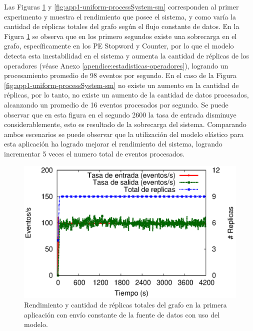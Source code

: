 
Las Figuras \ref{fig:app1-uniform-processSystem-cm} y \ref{fig:app1-uniform-processSystem-sm} \normalsize{corresponden al primer experimento y muestra el rendimiento que posee el sistema, y como var\'ia la cantidad de r\'eplicas totales del grafo seg\'un el flujo constante de datos.} En la Figura \ref{fig:app1-uniform-processSystem-cm} \normalsize{se observa que en los primero segundos existe una sobrecarga en el grafo, espec\'ificamente en los PE Stopword y Counter, por lo que el modelo detecta esta inestabilidad en el sistema y aumenta la cantidad de r\'eplicas de los operadores} (v\'ease Anexo \ref{apendice:estadisticas-operadores}), \normalsize{logrando un procesamiento promedio de  98 eventos por segundo.} En el caso de la Figura \ref{fig:app1-uniform-processSystem-sm} \normalsize{no existe un aumento en la cantidad de r\'eplicas, por lo tanto, no existe un aumento de la cantidad de datos procesados, alcanzando un promedio de 16 eventos procesados por segundo. Se puede observar que en esta figura en el segundo 2600 la tasa de entrada disminuye considerablemente, esto es resultado de la sobrecarga del sistema. Comparando ambos escenarios se puede observar que la utilizaci\'on del modelo el\'astico para esta aplicaci\'on ha logrado mejorar el rendimiento del sistema, logrando incrementar 5 veces el numero total de eventos procesados.}

\begin{figure}[!ht]
	\centering
	\includegraphics[scale=0.65]{images/exp/app1/uniform/cm/processSystem.eps}
    \caption{Rendimiento y cantidad de r\'eplicas totales del grafo en la primera aplicaci\'on con env\'io constante de la fuente de datos con uso del modelo.}
	\label{fig:app1-uniform-processSystem-cm}
\end{figure}

